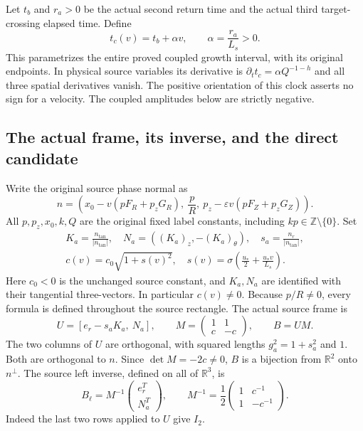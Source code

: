 \documentclass[11pt]{article}
\begin{document}
Let $t_b$ and $r_a>0$ be the actual second return time and the actual
third target-crossing elapsed time. Define
\begin{equation}\label{tgframe:coupledclock}
 t_c(v)=t_b+\alpha v,\qquad \alpha=\frac{r_a}{L_s}>0.
\end{equation}
This parametrizes the entire proved coupled growth interval, with its
original endpoints. In physical source variables its derivative is
$\partial_tt_c=\alpha Q^{-1-h}$ and all three spatial derivatives vanish.
The positive orientation of this clock asserts no sign for a velocity.
The coupled amplitudes below are strictly negative.

\subsection{The actual frame, its inverse, and the direct candidate}

Write the original source phase normal as
\[
 n=\left(x_0-v(pF_R+p_zG_R),\ \frac pR,\
             p_z-\varepsilon v(pF_Z+p_zG_Z)\right).
\]
All $p,p_z,x_0,k,Q$ are the original fixed label constants, including
$kp\in\mathbb Z\setminus\{0\}$. Set
\[
\begin{gathered}
 K_a=\frac{n_{\tan}}{|n_{\tan}|},\quad
 N_a=((K_a)_z,-(K_a)_\theta),\quad
 s_a=\frac{n_r}{|n_{\tan}|},\\
 c(v)=c_0\sqrt{1+s(v)^2},
 \quad
 s(v)=\sigma\left(\frac{u_*}{2}+\frac{u_*v}{L_s}\right).
\end{gathered}
\]
Here $c_0<0$ is the unchanged source constant, and $K_a,N_a$
are identified with their tangential three-vectors. In particular
$c(v)\ne0$. Because $p/R\ne0$, every formula is defined throughout
the source rectangle. The actual source frame is
\[
 U=[e_r-s_aK_a,\ N_a],\qquad
 M=\begin{pmatrix}1&1\\c&-c\end{pmatrix},\qquad B=UM.
\]
The two columns of $U$ are orthogonal, with squared lengths
$g_a^2=1+s_a^2$ and $1$. Both are orthogonal to $n$.
Since $\det M=-2c\ne0$, $B$ is a bijection from $\mathbb R^2$
onto $n^\perp$. The source left inverse, defined on all of
$\mathbb R^3$, is
\begin{equation}\label{tgframe:leftinverse}
 B_\ell=M^{-1}\begin{pmatrix}e_r^T\\N_a^T\end{pmatrix},
 \qquad
 M^{-1}=\frac12\begin{pmatrix}1&c^{-1}\\1&-c^{-1}\end{pmatrix}.
\end{equation}
Indeed the last two rows applied to $U$ give $I_2$.
\end{document}
